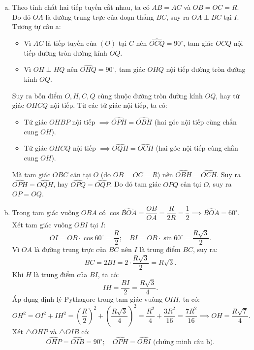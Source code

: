 \begin{bt}
{\begin{enumerate}[a)]
	Tam giác $OBP$ vuông tại $B$ nên nội tiếp đường tròn đường kính $OP$.
	Lại có $d \perp OH$ tại $H$ nên $\widehat{OHP} = 90^\circ$.
	Tam giác $OHP$ vuông tại $H$ nên nội tiếp đường tròn đường kính $OP$.
	Suy ra bốn điểm $O, H, B, P$ cùng thuộc đường tròn đường kính $OP$, hay tứ giác $OHBP$ nội tiếp.
	\item Theo tính chất hai tiếp tuyến cắt nhau, ta có $AB = AC$ và $OB = OC = R$.
	Do đó $OA$ là đường trung trực của đoạn thẳng $BC$, suy ra $OA \perp BC$ tại $I$.
	Tương tự câu a:
	\begin{itemize}
		\item Vì $AC$ là tiếp tuyến của $(O)$ tại $C$ nên $\widehat{OCQ} = 90^\circ$, tam giác $OCQ$ nội tiếp đường tròn đường kính $OQ$.
		\item Vì $OH \perp HQ$ nên $\widehat{OHQ} = 90^\circ$, tam giác $OHQ$ nội tiếp đường tròn đường kính $OQ$.
	\end{itemize}
	Suy ra bốn điểm $O, H, C, Q$ cùng thuộc đường tròn đường kính $OQ$, hay tứ giác $OHCQ$ nội tiếp.
	Từ các tứ giác nội tiếp, ta có:
	\begin{itemize}
		\item Tứ giác $OHBP$ nội tiếp $\implies \widehat{OPH} = \widehat{OBH}$ (hai góc nội tiếp cùng chắn cung $OH$).
		\item Tứ giác $OHCQ$ nội tiếp $\implies \widehat{OQH} = \widehat{OCH}$ (hai góc nội tiếp cùng chắn cung $OH$).
	\end{itemize}
	Mà tam giác $OBC$ cân tại $O$ (do $OB = OC = R$) nên $\widehat{OBH} = \widehat{OCH}$.
	Suy ra $\widehat{OPH} = \widehat{OQH}$, hay $\widehat{OPQ} = \widehat{OQP}$.
	Do đó tam giác $OPQ$ cân tại $O$, suy ra $OP = OQ$.
	\item Trong tam giác vuông $OBA$ có $\cos \widehat{BOA} = \dfrac{OB}{OA} = \dfrac{R}{2R} = \dfrac{1}{2} \implies \widehat{BOA} = 60^\circ$.
	Xét tam giác vuông $OBI$ tại $I$:
	$$OI = OB \cdot \cos 60^\circ = \dfrac{R}{2}; \quad BI = OB \cdot \sin 60^\circ = \dfrac{R\sqrt{3}}{2}.$$
	Vì $OA$ là đường trung trực của $BC$ nên $I$ là trung điểm $BC$, suy ra:
	$$BC = 2BI = 2 \cdot \dfrac{R\sqrt{3}}{2} = R\sqrt{3}.$$
	Khi $H$ là trung điểm của $BI$, ta có:
	$$IH = \dfrac{BI}{2} = \dfrac{R\sqrt{3}}{4}.$$
	Áp dụng định lý Pythagore trong tam giác vuông $OIH$, ta có:
	$$OH^2 = OI^2 + IH^2 = \left(\dfrac{R}{2}\right)^2 + \left(\dfrac{R\sqrt{3}}{4}\right)^2 = \dfrac{R^2}{4} + \dfrac{3R^2}{16} = \dfrac{7R^2}{16} \implies OH = \dfrac{R\sqrt{7}}{4}.$$
	Xét $\triangle OHP$ và $\triangle OIB$ có:
	$$\widehat{OHP} = \widehat{OIB} = 90^\circ; \quad \widehat{OPH} = \widehat{OBI}\text{ (chứng minh câu b)}.$$

\end{enumerate}}
\end{bt}
